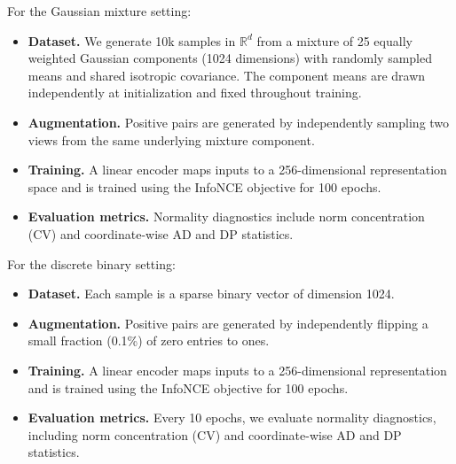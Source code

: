 \documentclass{article}
\begin{document}
For the Gaussian mixture setting:
\begin{itemize}
    \item \textbf{Dataset.} We generate 10k samples in $\mathbb{R}^d$ from a mixture of 25 equally weighted Gaussian components (1024 dimensions) with randomly sampled means and shared isotropic covariance. The component means are drawn independently at initialization and fixed throughout training.
    \item \textbf{Augmentation.} Positive pairs are generated by independently sampling two views from the same underlying mixture component.
    \item \textbf{Training.} A linear encoder maps inputs to a 256-dimensional representation space and is trained using the InfoNCE objective for 100 epochs.
    \item \textbf{Evaluation metrics.} Normality diagnostics include norm concentration (CV) and coordinate-wise AD and DP statistics.
\end{itemize}


For the discrete binary setting:
\begin{itemize}
    \item \textbf{Dataset.} Each sample is a sparse binary vector of dimension 1024.
    \item \textbf{Augmentation.} Positive pairs are generated by independently flipping a small fraction (0.1\%) of zero entries to ones.
    \item \textbf{Training.} A linear encoder maps inputs to a 256-dimensional representation and is trained using the InfoNCE objective for 100 epochs. 
    \item \textbf{Evaluation metrics.} Every 10 epochs, we evaluate normality diagnostics, including norm concentration (CV) and coordinate-wise AD and DP statistics.
\end{itemize}
\end{document}
